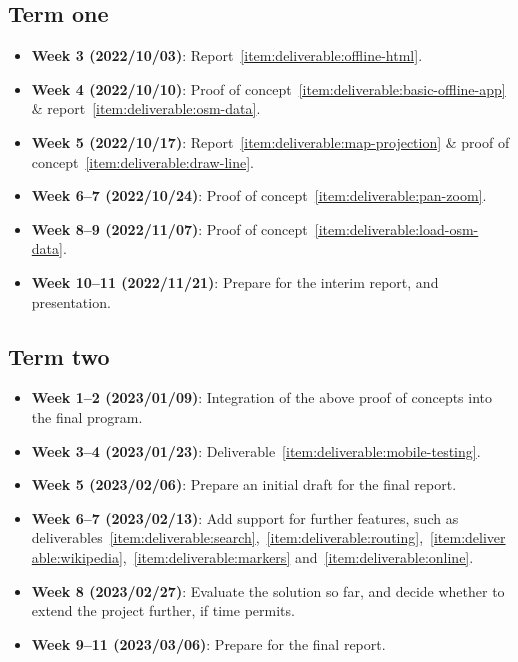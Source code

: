 \documentclass[hyphens]{final_report}
\begin{document}
\subsection{Term one}\label{sec:term-1-plan}

\begin{itemize}
    \item \textbf{Week 3 (2022/10/03)}: Report~\ref{item:deliverable:offline-html}.
    \item \textbf{Week 4 (2022/10/10)}: Proof of concept~\ref{item:deliverable:basic-offline-app} \& report~\ref{item:deliverable:osm-data}.
    \item \textbf{Week 5 (2022/10/17)}: Report~\ref{item:deliverable:map-projection} \& proof of concept~\ref{item:deliverable:draw-line}.
    \item \textbf{Week 6--7 (2022/10/24)}: Proof of concept~\ref{item:deliverable:pan-zoom}.
    \item \textbf{Week 8--9 (2022/11/07)}: Proof of concept~\ref{item:deliverable:load-osm-data}.
    \item \textbf{Week 10--11 (2022/11/21)}: Prepare for the interim report, and presentation.
\end{itemize}

\subsection{Term two}

\begin{itemize}
    \item \textbf{Week 1--2 (2023/01/09)}: Integration of the above proof of concepts into the final program.
    \item \textbf{Week 3--4 (2023/01/23)}: Deliverable~\ref{item:deliverable:mobile-testing}.
    \item \textbf{Week 5 (2023/02/06)}: Prepare an initial draft for the final report.
    \item \textbf{Week 6--7 (2023/02/13)}: Add support for further features, such as deliverables~\ref{item:deliverable:search},~\ref{item:deliverable:routing},~\ref{item:deliverable:wikipedia},~\ref{item:deliverable:markers} and~\ref{item:deliverable:online}.
    \item \textbf{Week 8 (2023/02/27)}: Evaluate the solution so far, and decide whether to extend the project further, if time permits.
    \item \textbf{Week 9--11 (2023/03/06)}: Prepare for the final report.
\end{itemize}
\end{document}
